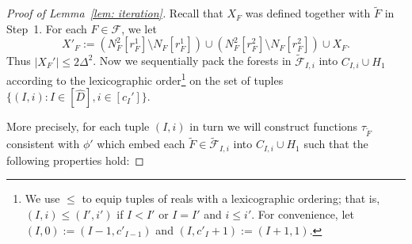 \documentclass[a4paper, 11pt, reqno]{amsart}
\numberwithin{equation}{section}
\newcommand{\1}{{\rm 1\hspace*{-0.4ex}%
\rule{0.1ex}{1.52ex}\hspace*{0.2ex}}}
\newcommand{\cF}{\mathcal{F}}
\newcommand{\I}{I}
\begin{document}
\begin{proof}[Proof of Lemma~\ref{lem: iteration}]
Recall that $X_F$ was defined together with $\tilde{F}$ in Step~1. For each $F \in \cF$, we let 
$$X'_{F}:= (N_F^2[r^1_F]\setminus N_F[r^1_F]) \cup (N_F^2[r^2_F]\setminus N_F[r^2_F])\cup X_F.$$
Thus $|X_F'|\leq 2\Delta^2$.
Now we sequentially pack the forests in $\tilde{\cF}_{{\I},i}$ into $C_{{\I},i}\cup H_1$ according to the lexicographic order\footnote{We use $\leq$ to equip tuples of reals with a lexicographic ordering; that is, $({\I},i)\leq ({\I}',i')$ if ${\I}<{\I}'$ or ${\I}={\I}'$ and $i\leq i'$. 
For convenience, let $({\I},0):= ({\I}-1,c'_{{\I}-1})$ and $({\I},c'_{{\I}}+1):=({\I}+1,1)$.} 
on the set of tuples $\{({\I},i): I\in [\hat{D}], i\in [c_\I'] \} $. 

More precisely, for each tuple $(\I,i)$ in turn we will construct functions $\tau_{\tilde{F}}$ consistent with $\phi'$ which embed each $\tilde{F} \in \tilde{\cF}_{{\I},i}$ into $C_{{\I},i}\cup H_1$
such that the following properties hold:


\end{proof}
\end{document}

